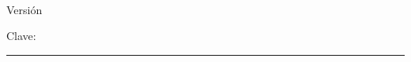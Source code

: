 \documentclass[11pt]{article}
\makeatletter
\newcommand{\myID}{\@ID}
\newcommand{\myDate}{\@Date}
\newcommand{\myTitulo}{\@Titulo}
\newcommand{\mySesion}{\ifx\@Sesion\@empty\else\ \textperiodcentered\ \@Sesion\fi}
\newcommand{\myClave}{\@Clave}
\makeatother
\begin{document}
{\sffamily
\textbf{\myTitulo}\mySesion\par
Versión \textbf{\myID} \textperiodcentered{} \myDate\par
\smallskip
Clave: \myClave\par
\medskip\hrule\medskip}

\begin{enumerate}


\end{enumerate}
\end{document}
